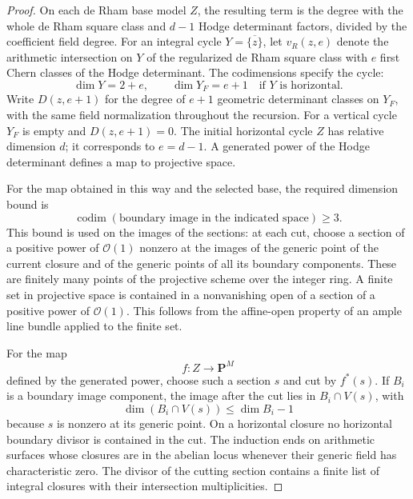 \begin{proof}
On each de Rham base model \(Z\), the resulting term is
the degree with the whole de Rham square class and
\(d-1\) Hodge determinant factors, divided by the
coefficient field degree. For an integral cycle \(Y=\overline{\{z\}}\),
let \(v_R(z,e)\) denote the arithmetic intersection on \(Y\) of the
regularized de Rham square class with \(e\) first Chern classes of the Hodge
determinant. The codimensions specify the cycle:
\begin{equation}\label{eq:flag-cut-cycle-dimension}
 \dim Y=2+e,\qquad
 \dim Y_F=e+1\quad\text{if }Y\text{ is horizontal}.
\end{equation}
Write \(D(z,e+1)\) for the degree of \(e+1\) geometric determinant
classes on \(Y_F\), with the same field normalization throughout the
recursion. For a vertical cycle \(Y_F\) is empty and \(D(z,e+1)=0\).
The initial horizontal cycle \(Z\) has relative dimension \(d\);
it corresponds to \(e=d-1\).
A generated power of the Hodge determinant defines a
map to projective space.

For the map obtained in this way and the selected base, the required dimension bound is
\[
 \operatorname{codim}(\text{boundary image in the indicated space})\ge3.
\]
This bound is used on the images of the sections:
at each cut, choose a section of a positive power of
\(\mathcal O(1)\) nonzero at the images of the generic point
of the current closure and of the generic points of all
its boundary components. These are finitely many points
of the projective scheme over the integer ring. A finite
set in projective space is contained in a nonvanishing
open of a section of a positive power of \(\mathcal O(1)\).
This follows from the affine-open property of an ample
line bundle applied to the finite set.

For the map
\[
 f:Z\to\mathbf P^M
\]
defined by the generated power, choose
such a section \(s\) and cut by \(f^*(s)\). If \(B_i\)
is a boundary image component, the image after the cut
lies in \(B_i\cap V(s)\), with
\[
                \dim(B_i\cap V(s))\le \dim B_i-1
\]
because \(s\) is nonzero at its generic point. On a
horizontal closure no horizontal boundary divisor is
contained in the cut. The induction
ends on arithmetic surfaces whose closures
are in the abelian locus whenever their generic field
has characteristic zero. The divisor of the cutting
section contains a finite list of integral closures with
their intersection multiplicities.


\end{proof}
